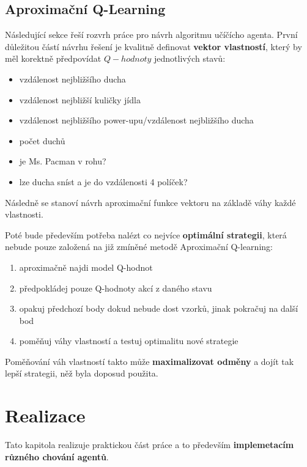 \section{Aproximační Q-Learning}
Následující sekce řeší rozvrh práce pro návrh algoritmu učíčícho agenta.
První důležitou částí návrhu řešení je kvalitně definovat \textbf{vektor vlastností}, který by měl korektně předpovídat $Q-hodnoty$ jednotlivých stavů:
\begin{itemize}
\item vzdálenost nejbližšího ducha
\item vzdálenost nejbližší kuličky jídla
\item vzdálenost nejbližšího power-upu/vzdálenost nejbližšího ducha
\item počet duchů
\item je Ms. Pacman v rohu?
\item lze ducha sníst a je do vzdálenosti 4 políček?
\end{itemize}
Následně se stanoví návrh aproximační funkce vektoru na základě váhy každé vlastnosti.

Poté bude především potřeba nalézt co nejvíce \textbf{optimální strategii}, která nebude pouze založená na již zmíněné metodě Aproximační Q-learning:
\begin{enumerate}
\item aproximačně najdi model Q-hodnot
\item předpokládej pouze Q-hodnoty akcí z daného stavu
\item opakuj předchozí body dokud nebude dost vzorků, jinak pokračuj na další bod
\item poměňuj váhy vlastností a testuj optimalitu nové strategie
\end{enumerate}
Poměňování váh vlastností takto může \textbf{maximalizovat odměny} a dojít tak lepší strategii, něž byla doposud použita.

\chapter{Realizace}
Tato kapitola realizuje praktickou část práce a to především \textbf{implemetacím různého chování agentů}.

